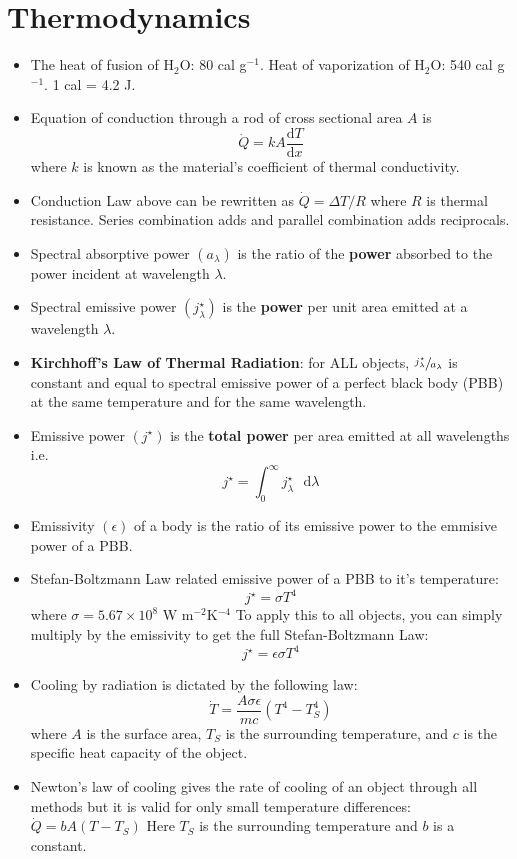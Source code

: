 \documentclass{scrartcl}
\begin{document}
    \section{Thermodynamics}
    \begin{itemize}
        \item The heat of fusion of H$_2$O: 80 cal g$^{-1}$. Heat of vaporization of H$_2$O: 540 cal g$^{-1}$. 1 cal = 4.2 J.
        \item Equation of conduction through a rod of cross sectional area $A$ is \[\dot Q=kA\frac{\mathrm dT}{\mathrm dx}\] where $k$ is known as the material's coefficient of thermal conductivity.
        \item Conduction Law above can be rewritten as $\dot Q=\Delta T/R$ where $R$ is thermal resistance. Series combination adds and parallel combination adds reciprocals.
        \item Spectral absorptive power $\left(a_\lambda\right)$ is the ratio of the \textbf{power} absorbed to the power incident at wavelength $\lambda$.
        \item Spectral emissive power $\left(j^\star_\lambda\right)$  is the \textbf{power} per unit area emitted at a wavelength $\lambda$.
        \item \textbf{Kirchhoff's Law of Thermal Radiation}: for ALL objects, $\sfrac{j^\star_\lambda}{a_\lambda}$  is constant and equal to spectral emissive power of a perfect black body (PBB) at the same temperature and for the same wavelength.
        \item Emissive power $\left(j^\star\right)$ is the \textbf{total power} per area emitted at all wavelengths i.e. \[j^\star=\int_0^\infty j^\star_\lambda\text{ }\mathrm d\lambda\]
        \item Emissivity $\left(\epsilon\right)$ of a body is the ratio of its emissive power to the emmisive power of a PBB.
        \item Stefan-Boltzmann Law related emissive power of a PBB to it's temperature: \[j^\star=\sigma T^4\] where $\sigma=5.67\times10^8$ W m$^{-2}$K$^{-4}$ To apply this to all objects, you can simply multiply by the emissivity to get the full Stefan-Boltzmann Law: \[j^\star=\epsilon\sigma T^4\]
        \item Cooling by radiation is dictated by the following law: \[\dot T=\frac{A\sigma \epsilon}{mc}\left(T^4-T_S^4\right)\] where $A$ is the surface area, $T_S$ is the surrounding temperature, and $c$ is the specific heat capacity of the object.
        \item Newton's law of cooling gives the rate of cooling of an object through all methods but it is valid for only small temperature differences: $\boxed{\dot Q=bA\left(T-T_S\right)}$ Here $T_S$ is the surrounding temperature and $b$ is a constant.

\end{itemize}
\end{document}
